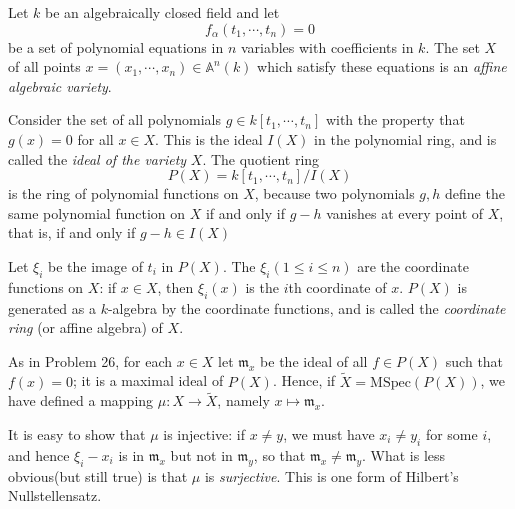 \documentclass{solution}
\begin{document}
\begin{problem}
    Let $k$ be an algebraically closed field and let
    $$f_{\alpha}(t_1, \cdots, t_n) = 0$$
    be a set of polynomial equations in $n$ variables with coefficients in $k$. The set $X$ of all points $x = (x_1, \cdots, x_n) \in \mathbb{A}^n(k)$ which satisfy these equations is an \textit{affine algebraic variety}.
    
    Consider the set of all polynomials $g \in k[t_1, \cdots, t_n]$ with the property that $g(x) = 0$ for all $x \in X$. This is the ideal $I(X)$ in the polynomial ring, and is called the \textit{ideal of the variety} $X$. The quotient ring
    $$P(X) = k[t_1, \cdots, t_n] / I(X)$$
    is the ring of polynomial functions on $X$, because two polynomials $g, h$ define the same polynomial function on $X$ if and only if $g - h$ vanishes at every point of $X$, that is, if and only if $g - h \in I(X)$

    Let $\xi_i$ be the image of $t_i$ in $P(X)$. The $\xi_i(1 \le i \le n)$ are the coordinate functions on $X$: if $x \in X$, then $\xi_i(x)$ is the $i$th coordinate of $x$. $P(X)$ is generated as a $k$-algebra by the coordinate functions, and is called the \textit{coordinate ring} (or affine algebra) of $X$.

    As in Problem 26, for each $x \in X$ let $\mathfrak{m}_x$ be the ideal of all $f \in P(X)$ such that $f(x) = 0$; it is a maximal ideal of $P(X)$. Hence, if $\tilde{X} = \mathrm{MSpec}(P(X))$, we have defined a mapping $\mu: X \rightarrow \tilde{X}$, namely $x \mapsto \mathfrak{m}_x$.

    It is easy to show that $\mu$ is injective: if $x \ne y$, we must have $x_i \ne y_i$ for some $i$, and hence $\xi_i - x_i$ is in $\mathfrak{m}_x$ but not in $\mathfrak{m}_y$, so that $\mathfrak{m}_x \ne \mathfrak{m}_y$. What is less obvious(but still true) is that $\mu$ is \textit{surjective}. This is one form of Hilbert's Nullstellensatz.
\end{problem}
\end{document}
